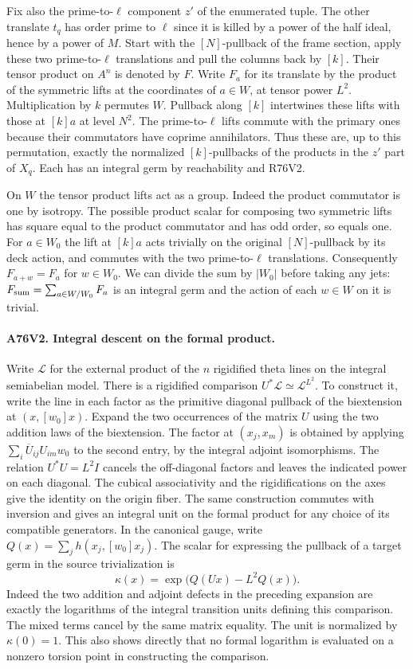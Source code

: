 Fix also the prime-to-$\ell$ component $z'$ of the enumerated
tuple. The other translate $t_q$ has order prime to $\ell$
since it is killed by a power of the half ideal, hence by a
power of $M$. Start with the $[N]$-pullback of the frame section,
apply these two prime-to-$\ell$ translations and pull the columns
back by $[k]$. Their tensor product on $A^n$ is denoted by $F$.
Write $F_a$ for its translate by the product of the symmetric
lifts at the coordinates of $a\in W$, at tensor power $L^2$.
Multiplication by $k$ permutes $W$. Pullback along $[k]$
intertwines these lifts with those at $[k]a$ at level $N^2$.
The prime-to-$\ell$ lifts commute with the primary ones because
their commutators have coprime annihilators. Thus these are,
up to this permutation, exactly the normalized $[k]$-pullbacks
of the products in the $z'$ part of $X_q$. Each has an integral
germ by reachability and R76V2.

On $W$ the tensor product lifts act as a group. Indeed the
product commutator is one by isotropy. The possible product
scalar for composing two symmetric lifts has square equal to
the product commutator and has odd order, so equals one.
For $a\in W_0$ the lift at $[k]a$ acts trivially on the original
$[N]$-pullback by its deck action, and commutes with the two
prime-to-$\ell$ translations. Consequently $F_{a+w}=F_a$
for $w\in W_0$. We can divide the sum by $|W_0|$ before taking
any jets: $F_{\rm sum}=\sum_{a\in W/W_0}F_a$ is an integral
germ and the action of each $w\in W$ on it is trivial.

\paragraph{A76V2. Integral descent on the formal product.}
Write $\mathcal L$ for the external product of the $n$
rigidified theta lines on the integral semiabelian model.
There is a rigidified comparison
$U^*\mathcal L\simeq\mathcal L^{L^2}$. To construct it, write
the line in each factor as the primitive diagonal pullback of
the biextension at $(x,[w_0]x)$. Expand the two occurrences
of the matrix $U$ using the two addition laws of the
biextension. The factor at $(x_j,x_m)$ is obtained by applying
$\sum_i\overline{U}_{ij}U_{im}w_0$ to the second entry, by the
integral adjoint isomorphisms. The relation $U^*U=L^2 I$
cancels the off-diagonal factors and leaves the indicated
power on each diagonal. The cubical associativity and the
rigidifications on the axes give the identity on the origin
fiber. The same construction commutes with inversion and gives
an integral unit on the formal product for any choice of its
compatible generators. In the canonical gauge, write
$Q(x)=\sum_j h(x_j,[w_0]x_j)$. The scalar for expressing the
pullback of a target germ in the source trivialization is
\[
               \kappa(x)=\exp\big(Q(Ux)-L^2 Q(x)\big).
\]
Indeed the two addition and adjoint defects in the preceding
expansion are exactly the logarithms of the integral transition
units defining this comparison. The mixed terms cancel by the
same matrix equality. The unit is normalized by $\kappa(0)=1$.
This also shows directly that no formal logarithm is evaluated
on a nonzero torsion point in constructing the comparison.

